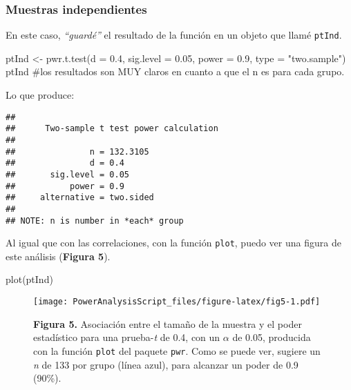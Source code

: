 \documentclass[
]{article}
\newenvironment{Shaded}{\begin{snugshade}}{\end{snugshade}}
\newcommand{\AttributeTok}[1]{\textcolor[rgb]{0.16,0.50,0.73}{#1}}
\newcommand{\CommentTok}[1]{\textcolor[rgb]{0.48,0.49,0.49}{#1}}
\newcommand{\FloatTok}[1]{\textcolor[rgb]{0.96,0.45,0.00}{#1}}
\newcommand{\FunctionTok}[1]{\textcolor[rgb]{0.56,0.27,0.68}{#1}}
\newcommand{\NormalTok}[1]{\textcolor[rgb]{0.81,0.81,0.76}{#1}}
\newcommand{\OtherTok}[1]{\textcolor[rgb]{0.15,0.68,0.38}{#1}}
\newcommand{\StringTok}[1]{\textcolor[rgb]{0.96,0.31,0.31}{#1}}
\begin{document}
\hypertarget{TInd}{%
\subsubsection{Muestras independientes}\label{TInd}}

En este caso, \emph{``guardé''} el resultado de la función en un objeto
que llamé \texttt{ptInd}.

\begin{Shaded}
\begin{Highlighting}[]
\NormalTok{ptInd }\OtherTok{\textless{}{-}} \FunctionTok{pwr.t.test}\NormalTok{(}\AttributeTok{d =} \FloatTok{0.4}\NormalTok{,}
                    \AttributeTok{sig.level =} \FloatTok{0.05}\NormalTok{,}
                    \AttributeTok{power =} \FloatTok{0.9}\NormalTok{,}
                    \AttributeTok{type =} \StringTok{"two.sample"}\NormalTok{)}
\NormalTok{ptInd }\CommentTok{\#los resultados son MUY claros en cuanto a que el n es para cada grupo.}
\end{Highlighting}
\end{Shaded}

Lo que produce:

\begin{verbatim}
## 
##      Two-sample t test power calculation 
## 
##               n = 132.3105
##               d = 0.4
##       sig.level = 0.05
##           power = 0.9
##     alternative = two.sided
## 
## NOTE: n is number in *each* group
\end{verbatim}

Al igual que con las correlaciones, con la función \texttt{plot}, puedo
ver una figura de este análisis (\textbf{Figura 5}).

\begin{Shaded}
\begin{Highlighting}[]
\FunctionTok{plot}\NormalTok{(ptInd)}
\end{Highlighting}
\end{Shaded}

\begin{figure}
\centering
\texttt{[image: PowerAnalysisScript\_files/figure-latex/fig5-1.pdf]}
\caption{\textbf{Figura 5.} Asociación entre el tamaño de la muestra y
el poder estadístico para una prueba-\emph{t} de 0.4, con un \(\alpha\)
de 0.05, producida con la función \texttt{plot} del paquete
\texttt{pwr}. Como se puede ver, sugiere un \emph{n} de 133 por grupo
(línea azul), para alcanzar un poder de 0.9 (90\%).}
\end{figure}
\end{document}
